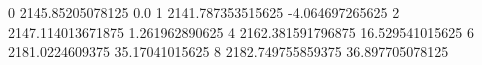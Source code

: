 0 2145.85205078125 0.0
1 2141.787353515625 -4.064697265625
2 2147.114013671875 1.261962890625
4 2162.381591796875 16.529541015625
6 2181.0224609375 35.17041015625
8 2182.749755859375 36.897705078125
